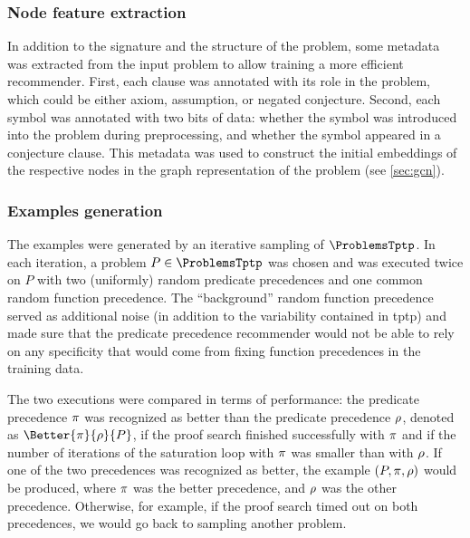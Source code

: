 \subsubsection{Node feature extraction}

In addition to the signature and the structure of the problem,
some metadata was extracted from the input problem to allow training a more efficient recommender.
First, each clause was annotated with its role in the problem,
which could be either axiom, assumption, or negated conjecture.
Second, each symbol was annotated with two bits of data:
whether the symbol was introduced into the problem during preprocessing,
and whether the symbol appeared in a conjecture clause.
This metadata was used to construct the initial embeddings of the respective nodes
in the graph representation of the problem (see \cref{sec:gcn}).

\subsubsection{Examples generation}

The examples were generated by an iterative sampling of $\ProblemsTptp$.
In each iteration, a problem $P \in \ProblemsTptp$ was chosen and \Vampire{} was executed twice on $P$
with two (uniformly) random predicate precedences and one common random function precedence.
The ``background'' random function precedence served as additional noise (in addition to the variability 
contained in \acrshort{tptp}) and made sure that the predicate precedence recommender
would not be able to rely on any specificity that would come from fixing function precedences in the training data.

The two executions were compared in terms of performance:
the predicate precedence $\pi$ was recognized as better than the predicate precedence $\rho$,
denoted as $\Better{\PrecBetter}{\PrecWorse}{P}$,
if the proof search finished successfully with $\pi$
and if the number of iterations of the saturation loop with $\pi$ was smaller than with $\rho$.
If one of the two precedences was recognized as better,
the example $(P, \pi, \rho)$ would be produced,
where $\pi$ was the better precedence,
and $\rho$ was the other precedence.
Otherwise, for example, if the proof search timed out on both precedences, we would go back to sampling another problem.

